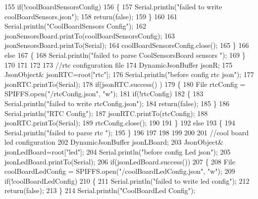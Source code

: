 \begin{DoxyCode}
155         \textcolor{keywordflow}{if}(!coolBoardSensorsConfig)
156         \{
157             Serial.println(\textcolor{stringliteral}{"failed to write coolBoardSensors.json"});
158             \textcolor{keywordflow}{return}(\textcolor{keyword}{false});
159         \}
160         
161         Serial.println(\textcolor{stringliteral}{"CoolBoardSensors Config"});
162         jsonSensorsBoard.printTo(coolBoardSensorsConfig);
163         jsonSensorsBoard.printTo(Serial);
164         coolBoardSensorsConfig.close();
165     \}
166     \textcolor{keywordflow}{else}
167     \{
168         Serial.println(\textcolor{stringliteral}{"failed to parse CoolSensorsBoard sensors "});    
169     \}
170     
171     
172     
173     \textcolor{comment}{//rtc configuration file}
174     DynamicJsonBuffer jsonR;
175         JsonObject& jsonRTC=root[\textcolor{stringliteral}{"rtc"}];
176     Serial.println(\textcolor{stringliteral}{"before config rtc json"});
177     jsonRTC.printTo(Serial);
178     \textcolor{keywordflow}{if}(jsonRTC.success() )
179     \{
180         File rtcConfig = SPIFFS.open(\textcolor{stringliteral}{"/rtcConfig.json"}, \textcolor{stringliteral}{"w"});   
181         \textcolor{keywordflow}{if}(!rtcConfig)
182         \{
183             Serial.println(\textcolor{stringliteral}{"failed to write rtcConfig.json"});
184             \textcolor{keywordflow}{return}(\textcolor{keyword}{false});
185         \}
186         Serial.println(\textcolor{stringliteral}{"RTC Config"});
187         jsonRTC.printTo(rtcConfig);
188         jsonRTC.printTo(Serial);
189         rtcConfig.close();
190     
191     \}
192     \textcolor{keywordflow}{else}
193     \{
194         Serial.println(\textcolor{stringliteral}{"failed to parse rtc "});
195     \}
196 
197     
198     
199     
200     
201         \textcolor{comment}{//cool board led configuration}
202     DynamicJsonBuffer jsonLBoard;
203         JsonObject& jsonLedBoard=root[\textcolor{stringliteral}{"led"}];
204     Serial.println(\textcolor{stringliteral}{"before config Led json"});
205     jsonLedBoard.printTo(Serial);
206     \textcolor{keywordflow}{if}(jsonLedBoard.success())
207     \{   
208         File coolBoardLedConfig = SPIFFS.open(\textcolor{stringliteral}{"/coolBoardLedConfig.json"}, \textcolor{stringliteral}{"w"}); 
209         \textcolor{keywordflow}{if}(!coolBoardLedConfig)
210         \{
211             Serial.println(\textcolor{stringliteral}{"failed to write led config"});
212             \textcolor{keywordflow}{return}(\textcolor{keyword}{false});
213         \}
214         Serial.println(\textcolor{stringliteral}{"CoolBoardLed Config"});

\end{DoxyCode}
